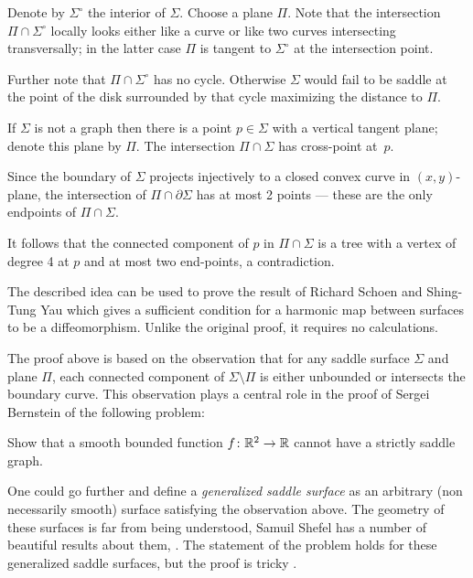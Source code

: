 Denote by $\Sigma^\circ$ the interior of $\Sigma$.
Choose a plane $\Pi$. 
Note that the intersection $\Pi\cap \Sigma^\circ$ 
locally looks either like a curve or like two curves intersecting transversally;
in the latter case $\Pi$ is tangent to $\Sigma^\circ$ at the intersection point.

Further note that $\Pi\cap \Sigma^\circ$ has no cycle.
Otherwise $\Sigma$ would fail to be saddle at the point of the disk surrounded by that cycle maximizing the distance to $\Pi$.

If $\Sigma$ is not a graph then there is a point $p\in\Sigma$ with a vertical tangent plane;
denote this plane by $\Pi$.
The intersection $\Pi\cap\Sigma$ has cross-point at~$p$.

Since the boundary of $\Sigma$ projects injectively to a closed convex curve in $(x,y)$-plane,
the intersection of $\Pi\cap\partial \Sigma$ has at most 2 points --- these are the only endpoints of $\Pi\cap\Sigma$.

It follows that the connected component of $p$ in $\Pi\cap\Sigma$ is a tree 
with a vertex of degree 4 at $p$ and at most two end-points, a contradiction.\qeds

The described idea can be used to prove the result of Richard Schoen and Shing-Tung  Yau \cite{schoen-yau-2D} which gives a sufficient condition for a harmonic map between surfaces to be a diffeomorphism.
Unlike the original proof, it requires no calculations.

The proof above is based on the observation 
that for any saddle surface $\Sigma$ and plane $\Pi$,
each connected component of $\Sigma\setminus \Pi$ is either unbounded or intersects the boundary curve.
This observation plays a central role in the proof of Sergei Bernstein \cite{bernshtein}
of the following problem:

\begin{pr}
Show that a smooth bounded function $f\colon\mathbb{R}^2\to\mathbb{R}$ cannot have a strictly saddle graph.
\end{pr}

One could go further and define a \emph{generalized saddle surface} as an arbitrary (non necessarily smooth) surface satisfying the observation above.
The geometry of these surfaces is far from being understood,
Samuil Shefel has a number of beautiful results about them, 
\cite[see][and the references therein]{shefel, AKP-invitation}.
The statement of the problem holds for these generalized saddle surfaces, but
the proof is tricky \cite{petrunin-stadler}.



